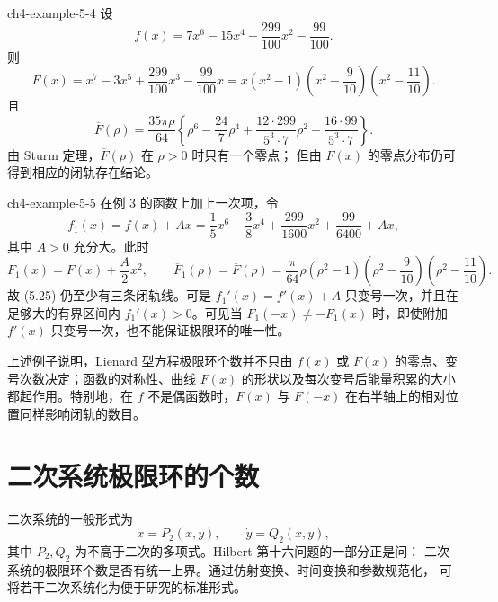 \begin{example}{ }{ch4-example-5-4}
设
\[
f(x)=7x^6-15x^4+\dfrac{299}{100}x^2-\dfrac{99}{100}.
\]
则
\[
F(x)=x^7-3x^5+\dfrac{299}{100}x^3-\dfrac{99}{100}x
=x(x^2-1)\left(x^2-\dfrac9{10}\right)
\left(x^2-\dfrac{11}{10}\right).
\]
且
\[
\overline F(\rho)=\dfrac{35\pi\rho}{64}
\left\{\rho^6-\dfrac{24}{7}\rho^4
+\dfrac{12\cdot299}{5^3\cdot7}\rho^2
-\dfrac{16\cdot99}{5^3\cdot7}\right\}.
\]
由 Sturm 定理，\(\overline F(\rho)\) 在 \(\rho>0\) 时只有一个零点；
但由 \(F(x)\) 的零点分布仍可得到相应的闭轨存在结论。
\end{example}

\begin{example}{ }{ch4-example-5-5}
在例 3 的函数上加上一次项，令
\[
f_1(x)=f(x)+Ax
=\dfrac15x^6-\dfrac38x^4+\dfrac{299}{1600}x^2
+\dfrac{99}{6400}+Ax,
\]
其中 $A>0$ 充分大。此时
\[
F_1(x)=F(x)+\dfrac A2x^2,\qquad
\overline F_1(\rho)=\overline F(\rho)
=\dfrac\pi{64}\rho(\rho^2-1)
\left(\rho^2-\dfrac9{10}\right)
\left(\rho^2-\dfrac{11}{10}\right).
\]
故 (5.25) 仍至少有三条闭轨线。可是 $f_1'(x)=f'(x)+A$ 只变号一次，并且在足够大的有界区间内 $f_1'(x)>0$。可见当 $F_1(-x)\ne-F_1(x)$ 时，即使附加 $f'(x)$ 只变号一次，也不能保证极限环的唯一性。
\end{example}


上述例子说明，Lienard 型方程极限环个数并不只由 $f(x)$ 或 $F(x)$ 的零点、变号次数决定；函数的对称性、曲线 $F(x)$ 的形状以及每次变号后能量积累的大小都起作用。特别地，在 $f$ 不是偶函数时，$F(x)$ 与 $F(-x)$ 在右半轴上的相对位置同样影响闭轨的数目。

\section{二次系统极限环的个数}

\iffalse
二次系统的一般形式为
\[
  \dot{x}=P_2(x,y),\qquad \dot{y}=Q_2(x,y), \tag{6.1}
\]
其中 $P_2,Q_2$ 为不高于二次的多项式。Hilbert 第十六问题的一部分正是问：
二次系统的极限环个数是否有统一上界。通过仿射变换、时间变换和参数规范化，
可将若干二次系统化为便于研究的标准形式。

